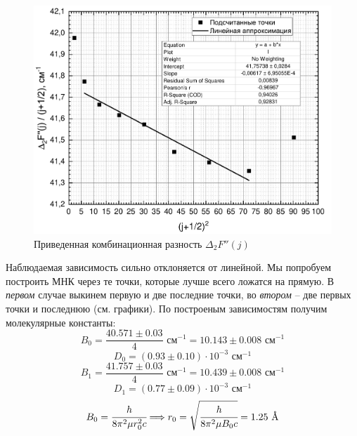 \begin{figure}[H]
	\vspace{-1cm}
	\centering
	\includegraphics[height=0.49\textheight]{data/delta_F''_j_sq}
	\vspace{-0.2cm}
	\caption{Приведенная комбинационная разность $\Delta_2F''(j)$}
	\label{deltaF''_j}
\end{figure}

Наблюдаемая зависимость сильно отклоняется от линейной. Мы попробуем построить МНК через те точки, которые лучше всего ложатся на прямую. В \textit{первом} случае выкинем первую и две последние точки, во \textit{втором} -- две первых точки и последнюю (см. графики). По построеным зависимостям
получим молекулярные константы:
\begin{equation}
B_0 = \dfrac{40.571 \pm 0.03}{4} \text{ см}^{-1}
= 10.143 \pm 0.008 \text{ см$^{-1}$}
\end{equation}
\begin{equation}
D_0 = (0.93 \pm 0.10) \cdot 10^{-3} \text{ см$^{-1}$}
\end{equation}
\begin{equation}
B_1 = \dfrac{41.757 \pm 0.03}{4} \text{ см}^{-1}
= 10.439 \pm 0.008 \text{ см$^{-1}$}
\end{equation}
\begin{equation}
D_1 = (0.77 \pm 0.09) \cdot 10^{-3} \text{ см$^{-1}$}
\end{equation}
\begin{equation}
B_0 = \cfrac{h}{8\pi^2\mu r_0^2c} \Longrightarrow
r_0 = \sqrt{\cfrac{h}{8\pi^2\mu B_0 c}} = 1.25 \text{ \AA}
\end{equation}

